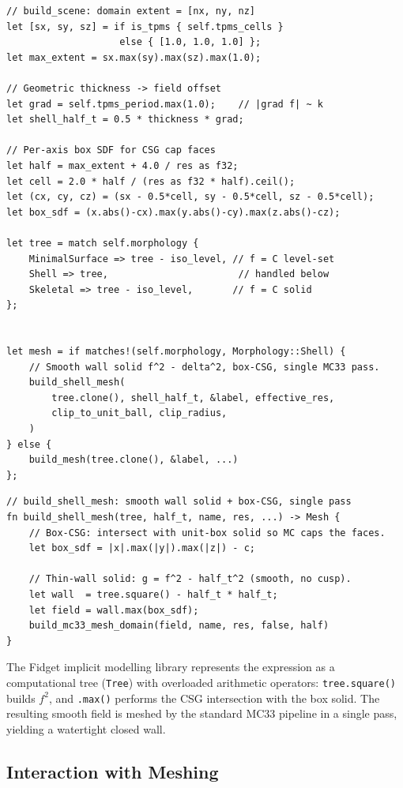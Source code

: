\documentclass[11pt]{article}
\begin{document}
\begin{lstlisting}
// build_scene: domain extent = [nx, ny, nz]
let [sx, sy, sz] = if is_tpms { self.tpms_cells }
                    else { [1.0, 1.0, 1.0] };
let max_extent = sx.max(sy).max(sz).max(1.0);

// Geometric thickness -> field offset
let grad = self.tpms_period.max(1.0);    // |grad f| ~ k
let shell_half_t = 0.5 * thickness * grad;

// Per-axis box SDF for CSG cap faces
let half = max_extent + 4.0 / res as f32;
let cell = 2.0 * half / (res as f32 * half).ceil();
let (cx, cy, cz) = (sx - 0.5*cell, sy - 0.5*cell, sz - 0.5*cell);
let box_sdf = (x.abs()-cx).max(y.abs()-cy).max(z.abs()-cz);

let tree = match self.morphology {
    MinimalSurface => tree - iso_level, // f = C level-set
    Shell => tree,                       // handled below
    Skeletal => tree - iso_level,       // f = C solid
};


let mesh = if matches!(self.morphology, Morphology::Shell) {
    // Smooth wall solid f^2 - delta^2, box-CSG, single MC33 pass.
    build_shell_mesh(
        tree.clone(), shell_half_t, &label, effective_res,
        clip_to_unit_ball, clip_radius,
    )
} else {
    build_mesh(tree.clone(), &label, ...)
};
\end{lstlisting}

\begin{lstlisting}
// build_shell_mesh: smooth wall solid + box-CSG, single pass
fn build_shell_mesh(tree, half_t, name, res, ...) -> Mesh {
    // Box-CSG: intersect with unit-box solid so MC caps the faces.
    let box_sdf = |x|.max(|y|).max(|z|) - c;

    // Thin-wall solid: g = f^2 - half_t^2 (smooth, no cusp).
    let wall  = tree.square() - half_t * half_t;
    let field = wall.max(box_sdf);
    build_mc33_mesh_domain(field, name, res, false, half)
}
\end{lstlisting}

The Fidget implicit modelling library represents the expression as a
computational tree (\texttt{Tree}) with overloaded arithmetic
operators: \texttt{tree.square()} builds $f^2$, and \texttt{.max()}
performs the CSG intersection with the box solid.  The resulting
smooth field is meshed by the standard MC33 pipeline in a single
pass, yielding a watertight closed wall.

\subsection{Interaction with Meshing}
\end{document}

